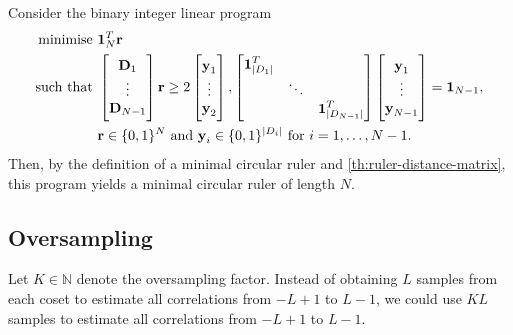 \documentclass[a4paper, openany, oneside]{memoir}
\begin{document}
Consider the binary integer linear program
\begin{align*}
    \text{minimise } &\boldsymbol{\mathbf{1}}_N^T \boldsymbol{\mathbf{r}} \\
    \text{such that } &
    \begin{bmatrix}
        \boldsymbol{\mathbf{D}}_1 \\
        \vdots \\
        \boldsymbol{\mathbf{D}}_{N-1}
    \end{bmatrix} \boldsymbol{\mathbf{r}} \ge 2 \begin{bmatrix}
        \boldsymbol{\mathbf{y}}_1 \\
        \vdots \\
        \boldsymbol{\mathbf{y}}_2
    \end{bmatrix}, \begin{bmatrix}
        \boldsymbol{\mathbf{1}}_{|D_1|}^T & & \\
        & \ddots & \\
        & & \boldsymbol{\mathbf{1}}_{|D_{N-1}|}^T
    \end{bmatrix}  \begin{bmatrix}
        \boldsymbol{\mathbf{y}}_1 \\
        \vdots \\
        \boldsymbol{\mathbf{y}}_{N-1}
    \end{bmatrix} = \boldsymbol{\mathbf{1}}_{N-1}, \\
    & \boldsymbol{\mathbf{r}} \in \{0,1\}^N \text{ and } \boldsymbol{\mathbf{y}}_i \in \{0,1\}^{|D_i|} \text{ for } i = 1,\ldots,N-1.
\end{align*}
Then, by the definition of a minimal circular ruler and \cref{th:ruler-distance-matrix}, this program yields a minimal circular ruler of length $N$.

\subsection{Oversampling}
Let $K \in \mathbb{N}$ denote the oversampling factor. Instead of obtaining $L$ samples from each coset to estimate all correlations from $-L+1$ to $L-1$, we could use $KL$ samples to estimate all correlations from $-L+1$ to $L-1$.
\end{document}
